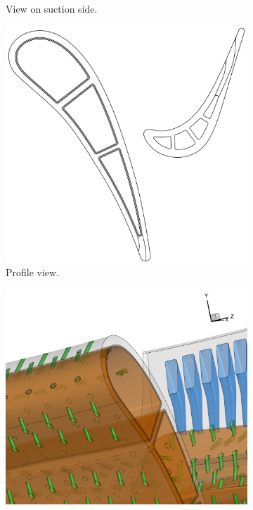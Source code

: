 \documentclass[a4paper, 11pt]{report}
\theoremstyle{definition}
\begin{document}
\begin{figure}[H]
\begin{subfigure}{.49\textwidth}
			\caption{View on suction side.}
		\end{subfigure}
		\begin{subfigure}{.49\textwidth}
			\includegraphics[width=\textwidth]{../tec/complete/003.png}
			\caption{Profile view.}
		\end{subfigure}
		\begin{subfigure}{.49\textwidth}
			\includegraphics[width=\textwidth]{../tec/complete/80.png}

\end{subfigure}
\end{figure}
\end{document}

